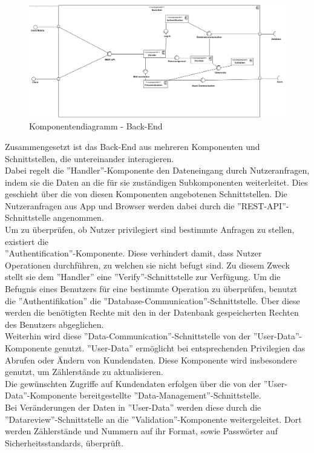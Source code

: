 \begin{figure}[h]
\includegraphics[width=15cm]{img/diagrams/component-back-end}
\caption{Komponentendiagramm - Back-End} 
\end{figure} \noindent
Zusammengesetzt ist das Back-End aus mehreren Komponenten und Schnittstellen, die untereinander interagieren.\\
Dabei regelt die ''Handler''-Komponente den Dateneingang durch Nutzeranfragen, indem sie die Daten an die für sie zuständigen Subkomponenten weiterleitet. Dies geschieht über die von diesen Komponenten angebotenen Schnittstellen. Die Nutzeranfragen aus App und Browser werden dabei durch die ''REST-API''-Schnittstelle angenommen.\\
Um zu überprüfen, ob Nutzer privilegiert sind bestimmte Anfragen zu stellen, existiert die \\''Authentification''-Komponente. Diese verhindert damit, dass Nutzer Operationen durchführen, zu welchen sie nicht befugt sind. Zu diesem Zweck stellt sie dem ''Handler'' eine ''Verify''-Schnittstelle zur Verfügung. Um die Befugnis eines Benutzers für eine bestimmte Operation zu überprüfen, benutzt die ''Authentifikation'' die ''Database-Communication''-Schnittstelle. Über diese werden die benötigten Rechte mit den in der Datenbank gespeicherten Rechten des Benutzers abgeglichen.\\
Weiterhin wird diese ''Data-Communication''-Schnittstelle von der ''User-Data''-Komponente genutzt. ''User-Data'' ermöglicht bei entsprechenden Privilegien das Abrufen oder Ändern von Kundendaten. Diese Komponente wird insbesondere genutzt, um Zählerstände zu aktualisieren.\\
Die gewünschten Zugriffe auf Kundendaten erfolgen über die von der ''User-Data''-Komponente bereitgestellte ''Data-Management''-Schnittstelle.\\
Bei Veränderungen der Daten in ''User-Data'' werden diese durch die ''Datareview''-Schnittstelle an die ''Validation''-Komponente weitergeleitet. Dort werden Zählerstände und Nummern auf ihr Format, sowie Passwörter auf Sicherheitsstandards, überprüft.\\
